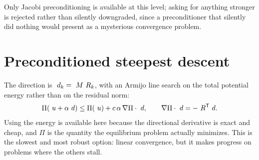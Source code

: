 Only Jacobi preconditioning is available at this level; asking for anything
stronger is rejected rather than silently downgraded, since a preconditioner
that silently did nothing would present as a mysterious convergence problem.

\section{Preconditioned steepest descent}

The direction is $~d_k = ~M~R_k$, with an Armijo line search on the
total potential energy rather than on the residual norm:
\begin{equation}
  \Pi(~u + \alpha~d) \le \Pi(~u) + c\,\alpha\, \nabla\Pi\cdot~d,
  \qquad \nabla\Pi\cdot~d = -~R^{\mathsf{T}}~d.
\end{equation}
Using the energy is available here because the directional derivative is exact
and cheap, and $\Pi$ is the quantity the equilibrium problem actually
minimizes.  This is the slowest and most robust option: linear convergence, but
it makes progress on problems where the others stall.
